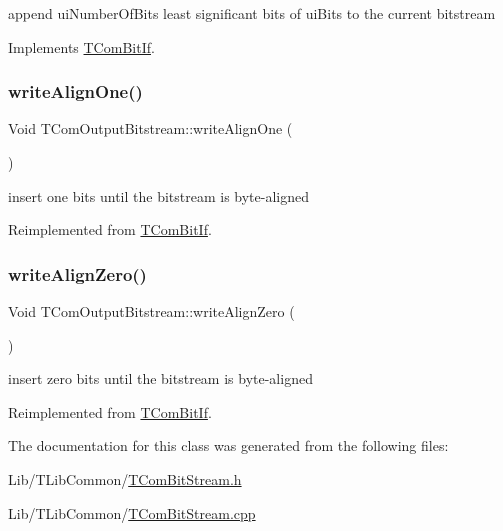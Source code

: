 append ui\+Number\+Of\+Bits least significant bits of ui\+Bits to the current bitstream 

Implements \hyperlink{class_t_com_bit_if}{T\+Com\+Bit\+If}.

\mbox{\label{class_t_com_output_bitstream_a5e2f3821fe5bb5adcf2df7895ee40ef5}} 
\subsubsection{\texorpdfstring{write\+Align\+One()}{writeAlignOne()}}
{\footnotesize\ttfamily Void T\+Com\+Output\+Bitstream\+::write\+Align\+One (\begin{DoxyParamCaption}{ }\end{DoxyParamCaption})\hspace{0.3cm}{\ttfamily [virtual]}}

insert one bits until the bitstream is byte-\/aligned 

Reimplemented from \hyperlink{class_t_com_bit_if}{T\+Com\+Bit\+If}.

\mbox{\label{class_t_com_output_bitstream_a44084ff25ad330d205b4ffff714b3df0}} 
\subsubsection{\texorpdfstring{write\+Align\+Zero()}{writeAlignZero()}}
{\footnotesize\ttfamily Void T\+Com\+Output\+Bitstream\+::write\+Align\+Zero (\begin{DoxyParamCaption}{ }\end{DoxyParamCaption})\hspace{0.3cm}{\ttfamily [virtual]}}

insert zero bits until the bitstream is byte-\/aligned 

Reimplemented from \hyperlink{class_t_com_bit_if}{T\+Com\+Bit\+If}.



The documentation for this class was generated from the following files\+:\begin{DoxyCompactItemize}
\item 
Lib/\+T\+Lib\+Common/\hyperlink{_t_com_bit_stream_8h}{T\+Com\+Bit\+Stream.\+h}\item 
Lib/\+T\+Lib\+Common/\hyperlink{_t_com_bit_stream_8cpp}{T\+Com\+Bit\+Stream.\+cpp}\end{DoxyCompactItemize}
